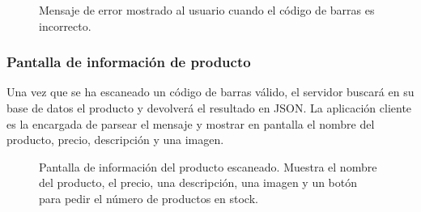 \begin{figure}[h]
	\centering
	\caption{Mensaje de error mostrado al usuario cuando el código de barras es incorrecto.}
	\label{fig:codigoBarrasError}
\end{figure}

\subsubsection{Pantalla de información de producto}
Una vez que se ha escaneado un código de barras válido, el servidor buscará en su base de datos el producto y devolverá el resultado en JSON. La aplicación cliente es la encargada de parsear el mensaje y mostrar en pantalla el nombre del producto, precio, descripción y una imagen.

\begin{figure}[h]
	\centering
	\caption{Pantalla de información del producto escaneado. Muestra el nombre del producto, el precio, una descripción, una imagen y un botón para pedir el número de productos en stock.}
	\label{fig:infoProducto}
\end{figure}

